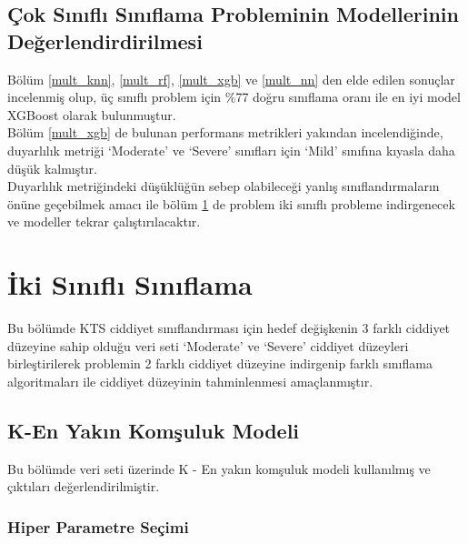 \documentclass[12pt,twoside]{deuthesis}
\begin{document}
\hypertarget{uxe7ok-sux131nux131flux131-sux131nux131flama-probleminin-modellerinin-deux11ferlendirdirilmesi}{%
\subsection{Çok Sınıflı Sınıflama Probleminin Modellerinin Değerlendirdirilmesi}\label{uxe7ok-sux131nux131flux131-sux131nux131flama-probleminin-modellerinin-deux11ferlendirdirilmesi}}

Bölüm \ref{mult_knn}, \ref{mult_rf}, \ref{mult_xgb} ve \ref{mult_nn} den elde edilen sonuçlar incelenmiş olup, üç sınıflı problem için \%77 doğru sınıflama oranı ile en iyi model XGBoost olarak bulunmuştur.\\
Bölüm \ref{mult_xgb} de bulunan performans metrikleri yakından incelendiğinde, duyarlılık metriği `Moderate' ve `Severe' sınıfları için `Mild' sınıfına kıyasla daha düşük kalmıştır.\\
Duyarlılık metriğindeki düşüklüğün sebep olabileceği yanlış sınıflandırmaların önüne geçebilmek amacı ile bölüm \ref{binary} de problem iki sınıflı probleme indirgenecek ve modeller tekrar çalıştırılacaktır.

\hypertarget{binary}{%
\section{İki Sınıflı Sınıflama}\label{binary}}

Bu bölümde KTS ciddiyet sınıflandırması için hedef değişkenin 3 farklı ciddiyet düzeyine sahip olduğu veri seti `Moderate' ve `Severe' ciddiyet düzeyleri birleştirilerek problemin 2 farklı ciddiyet düzeyine indirgenip farklı sınıflama algoritmaları ile ciddiyet düzeyinin tahminlenmesi amaçlanmıştır.

\hypertarget{bin_knn}{%
\subsection{K-En Yakın Komşuluk Modeli}\label{bin_knn}}

Bu bölümde veri seti üzerinde K - En yakın komşuluk modeli kullanılmış ve çıktıları değerlendirilmiştir.

\hypertarget{hiper-parametre-seuxe7imi-4}{%
\subsubsection{Hiper Parametre Seçimi}\label{hiper-parametre-seuxe7imi-4}}
\end{document}
